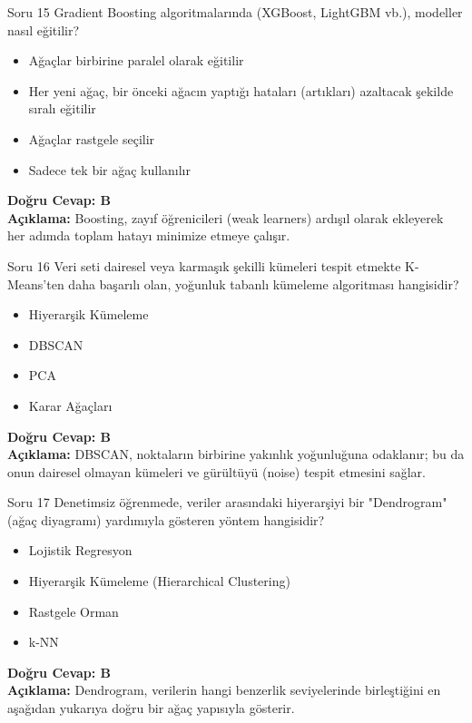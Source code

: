 \documentclass[12pt,a4paper]{article}
\begin{document}
\begin{testcard}{Soru 15}
    Gradient Boosting algoritmalarında (XGBoost, LightGBM vb.), modeller nasıl eğitilir?
    \begin{itemize}
        \item[A)] Ağaçlar birbirine paralel olarak eğitilir
        \item[B)] Her yeni ağaç, bir önceki ağacın yaptığı hataları (artıkları) azaltacak şekilde sıralı eğitilir
        \item[C)] Ağaçlar rastgele seçilir
        \item[D)] Sadece tek bir ağaç kullanılır
    \end{itemize}
    \tcblower
    \textbf{Doğru Cevap: B} \\
    \textbf{Açıklama:} Boosting, zayıf öğrenicileri (weak learners) ardışıl olarak ekleyerek her adımda toplam hatayı minimize etmeye çalışır.
\end{testcard}

\begin{testcard}{Soru 16}
    Veri seti dairesel veya karmaşık şekilli kümeleri tespit etmekte K-Means'ten daha başarılı olan, yoğunluk tabanlı kümeleme algoritması hangisidir?
    \begin{itemize}
        \item[A)] Hiyerarşik Kümeleme
        \item[B)] DBSCAN
        \item[C)] PCA
        \item[D)] Karar Ağaçları
    \end{itemize}
    \tcblower
    \textbf{Doğru Cevap: B} \\
    \textbf{Açıklama:} DBSCAN, noktaların birbirine yakınlık yoğunluğuna odaklanır; bu da onun dairesel olmayan kümeleri ve gürültüyü (noise) tespit etmesini sağlar.
\end{testcard}

\begin{testcard}{Soru 17}
    Denetimsiz öğrenmede, veriler arasındaki hiyerarşiyi bir "Dendrogram" (ağaç diyagramı) yardımıyla gösteren yöntem hangisidir?
    \begin{itemize}
        \item[A)] Lojistik Regresyon
        \item[B)] Hiyerarşik Kümeleme (Hierarchical Clustering)
        \item[C)] Rastgele Orman
        \item[D)] k-NN
    \end{itemize}
    \tcblower
    \textbf{Doğru Cevap: B} \\
    \textbf{Açıklama:} Dendrogram, verilerin hangi benzerlik seviyelerinde birleştiğini en aşağıdan yukarıya doğru bir ağaç yapısıyla gösterir.
\end{testcard}
\end{document}
